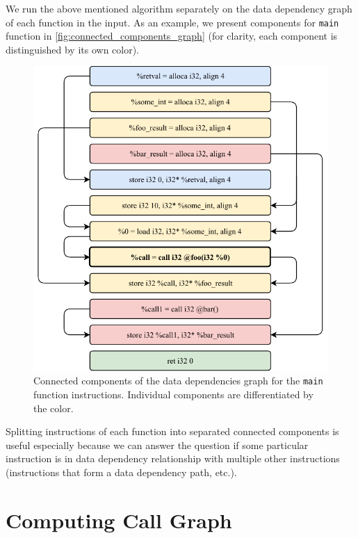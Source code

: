 \documentclass[12pt, twoside]{fithesis2}
\renewcommand{\_}{\leavevmode \kern0.07em\vbox{\hrule width0.4em}}
\begin{document}
We run the above mentioned algorithm separately on the data dependency
graph of each function in the input.
As an example, we present components for \texttt{main} function
in \autoref{fig:connected_components_graph} (for clarity, each component
is distinguished by its own color).

\begin{figure}[ht]
    \centering
    \includegraphics[]{images/main_components.pdf}
    \caption{Connected components of the data dependencies graph
    for the \texttt{main} function instructions. Individual components
    are differentiated by the color.}
    \label{fig:connected_components_graph}
\end{figure}

Splitting instructions of each function into separated connected components
is useful especially because we can answer the question if some particular
instruction is in data dependency relationship with multiple other instructions
(instructions that form a data dependency path, etc.).

\section{Computing Call Graph}
\label{sec:design-callgraph}
\end{document}
